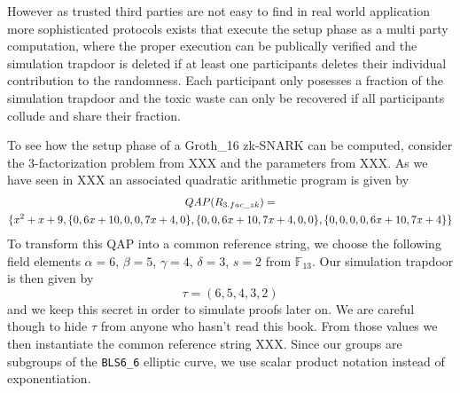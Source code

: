 However as trusted third parties are not easy to find in real world application more sophisticated protocols exists that execute the setup phase as a multi party computation, where the proper execution can be publically verified and the simulation trapdoor is deleted if at least one participants deletes their individual contribution to the randomness. Each participant only posesses a fraction of the simulation trapdoor and the toxic waste can only be recovered if all participants collude and share their fraction.
\begin{example} To see how the setup phase of a Groth\_16 zk-SNARK can be computed, consider the $3$-factorization problem from XXX and the parameters from XXX. As we have seen in XXX an associated quadratic arithmetic program is given by
\begin{multline*}
QAP(R_{3.fac\_zk}) =\\
\{x^{2}+x+9,\{0,6x+10,0,0,7x+4,0\},\{0,0,6x+10,7x+4,0,0\},\{0,0,0,0,6x+10,7x+4\}\}$$
\end{multline*}
To transform this QAP into a common reference string, we choose the following field elements $\alpha=6$, $\beta=5$, $\gamma=4$, $\delta=3$, $s=2$ from $\mathbb{F}_{13}$. 
Our simulation trapdoor is then given by
$$
\tau = (6,5,4,3,2)
$$
and we keep this secret in order to simulate proofs later on. We are careful though to hide $\tau$ from anyone who hasn't read this book. From those values we then instantiate the common reference string XXX. Since our groups are subgroups of the \texttt{BLS6\_6} elliptic curve, we use scalar product notation instead of exponentiation. 


\end{example}
